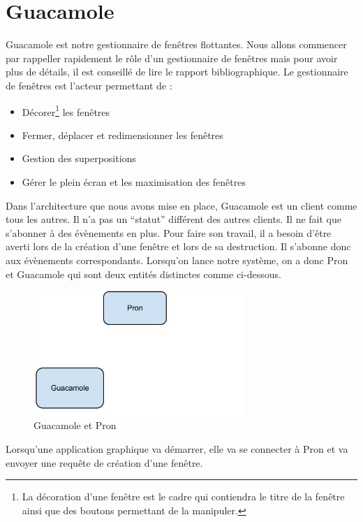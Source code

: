 \section{Guacamole}

Guacamole est notre gestionnaire de fenêtres flottantes.
Nous allons commencer par rappeller rapidement le rôle d'un gestionnaire de fenêtres mais pour avoir plus de détails, il est conseillé de lire le rapport bibliographique.
Le gestionnaire de fenêtres est l'acteur permettant de :

\begin{itemize}
  \item Décorer\footnote{La décoration d'une fenêtre est le cadre qui contiendra le titre de la fenêtre ainsi que des boutons permettant de la manipuler.} les fenêtres
  \item Fermer, déplacer et redimensionner les fenêtres
  \item Gestion des superpositions
  \item Gérer le plein écran et les maximisation des fenêtres
\end{itemize}

Dans l'architecture que nous avons mise en place, Guacamole est un client comme tous les autres. Il n'a pas un ``statut'' différent des autres clients. Il ne fait que s'abonner à des évènements en plus. Pour faire son travail, il a besoin d'être averti lors de la création d'une fenêtre et lors de sa destruction. Il s'abonne donc aux évènements correspondants. Lorsqu'on lance notre système, on a donc Pron et Guacamole qui sont deux entités distinctes comme ci-dessous.

\begin{figure}[H]
  \centering
  \includegraphics[width=8cm]{images/Guacamole_anim_1.jpg}
  \caption{Guacamole et Pron}
  \label{fig:guacamole_anim_1}
\end{figure}

Lorsqu'une application graphique va démarrer, elle va se connecter à Pron et va envoyer une requête de création d'une fenêtre.

